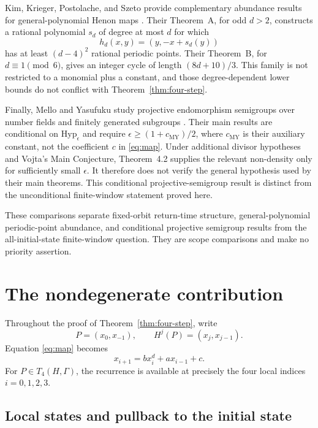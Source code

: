 \documentclass[11pt]{article}
\theoremstyle{definition}
\theoremstyle{remark}
\begin{document}
Kim, Krieger, Postolache, and Szeto provide complementary abundance results
for general-polynomial Henon maps \cite[Theorems~A--B]{KKPS2024}.
Their Theorem~A, for odd \(d>2\), constructs a rational polynomial \(s_d\)
of degree at most \(d\) for which
\[
 h_d(x,y)=(y,-x+s_d(y))
\]
has at least \((d-4)^2\) rational periodic points.  Their Theorem~B, for
\(d\equiv1\pmod6\), gives an integer cycle of length \((8d+10)/3\).
This family is not restricted to a monomial plus a constant, and those
degree-dependent lower bounds do not conflict with
Theorem~\ref{thm:four-step}.

Finally, Mello and Yasufuku study projective endomorphism semigroups over
number fields and finitely generated subgroups
\cite[Theorems~1.1--1.2, Corollary~1.3, and Theorem~4.2]{MY2026}.
Their main results are conditional on
\(\mathrm{Hyp}_\epsilon\) and require
\(\epsilon\ge(1+c_{\mathrm{MY}})/2\), where \(c_{\mathrm{MY}}\) is their
auxiliary constant, not the coefficient \(c\) in \eqref{eq:map}.
Under additional divisor hypotheses and Vojta's Main Conjecture,
Theorem~4.2 supplies the relevant non-density only for sufficiently small
\(\epsilon\).  It therefore does not verify the general hypothesis used by
their main theorems.  This conditional projective-semigroup result is
distinct from the unconditional finite-window statement proved here.

These comparisons separate fixed-orbit return-time structure,
general-polynomial periodic-point abundance, and conditional projective
semigroup results from the all-initial-state finite-window question.  They are scope comparisons and make no priority assertion.

\section{The nondegenerate contribution}\label{sec:nondegenerate}

Throughout the proof of Theorem~\ref{thm:four-step}, write
\begin{equation}\label{eq:coordinates}
 P=(x_0,x_{-1}),\qquad H^j(P)=(x_j,x_{j-1}).
\end{equation}
Equation \eqref{eq:map} becomes
\begin{equation}\label{eq:recurrence}
 x_{i+1}=b x_i^d+a x_{i-1}+c.
\end{equation}
For \(P\in T_4(H,\Gamma)\), the recurrence is available at precisely the
four local indices \(i=0,1,2,3\).

\subsection{Local states and pullback to the initial state}
\end{document}
